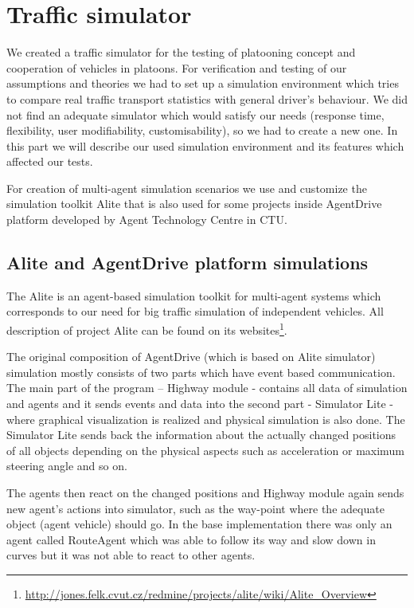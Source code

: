 \chapter{Traffic simulator}

We created a traffic simulator for the testing of platooning concept and cooperation of vehicles in platoons. For verification and testing of our assumptions and theories we had to set up a simulation environment which tries to compare real traffic transport statistics with general driver’s behaviour. We did not find an adequate simulator which would satisfy our needs (response time, flexibility, user modifiability, customisability), so we had to create a new one. In this part we will describe our used simulation environment and its features which affected our tests. 

For creation of multi-agent simulation scenarios we use and customize the simulation toolkit Alite that is also used for some projects inside AgentDrive platform developed by Agent Technology Centre in CTU.





\section{Alite and AgentDrive platform simulations}

The Alite is an agent-based simulation toolkit for multi-agent systems which corresponds to our need for big traffic simulation of independent vehicles. All description of project Alite can be found on its websites\footnote{\url{http://jones.felk.cvut.cz/redmine/projects/alite/wiki/Alite_Overview}}\cite{schaefer2011}.

The original composition of AgentDrive (which is based on Alite simulator) simulation mostly consists of two parts which have event based communication. The main part of the program – Highway module - contains all data of simulation and agents and it sends events and data into the second part - Simulator Lite - where graphical visualization is realized and physical simulation is also done. The Simulator Lite sends back the information about the actually changed positions of all objects depending on the physical aspects such as acceleration or maximum steering angle and so on. 

The agents then react on the changed positions and Highway module again sends new agent’s actions into simulator, such as the way-point where the adequate object (agent vehicle) should go. In the base implementation there was only an agent called RouteAgent which was able to follow its way and slow down in curves but it was not able to react to other agents.

